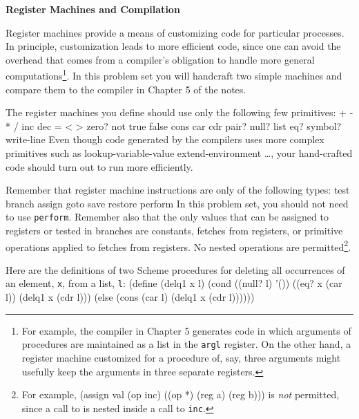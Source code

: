 

\newcommand{\Code}[1]{\mbox{\tt #1}}



\begin{center}
{\bf Register Machines and Compilation}
\end{center}

\medskip

Register machines provide a means of customizing code for particular
processes.  In principle, customization leads to more efficient code,
since one can avoid the overhead that comes from a compiler's obligation
to handle more general computations\footnote{For example, the compiler in Chapter
5 generates code in which arguments of procedures are maintained as a list
in the {\tt argl} register.  On the other hand, a register machine
customized for a procedure of, say, three arguments might usefully keep
the arguments in three separate registers.}.
In this problem set you will handcraft two simple machines and compare
them to the compiler in Chapter 5 of the notes.

The register machines you define should use only the following few
primitives:
\beginlisp
+ - * / inc dec = < > zero?  not true false
cons car cdr pair? null? list eq? symbol? write-line
\endlisp
Even though code generated by the compilers uses more complex primitives
such as 
\beginlisp
lookup-variable-value extend-environment \ldots,
\endlisp
your hand-crafted code should turn out to run more efficiently.

Remember that register machine instructions are only of the
following types:
\beginlisp
test branch assign goto save restore perform
\endlisp
In this problem set, you should not need to use {\tt perform}.
Remember also that the only values that can be assigned to registers
or tested in branches are constants, fetches from registers, or
primitive operations applied to fetches from registers.  No nested
operations are permitted\footnote{For example,
(assign val (op inc) ((op *) (reg a) (reg b)))  
is {\em not} permitted, since a call to {\tt *} is nested inside a
call to {\tt inc}.}.

\medskip
Here are the definitions of two Scheme procedures for deleting all
occurrences of an element, {\tt x}, from a list, {\tt l}:
\beginlisp
(define (delq1 x l)
  (cond ((null? l) '())
        ((eq? x (car l)) (delq1 x (cdr l)))
        (else (cons (car l) (delq1 x (cdr l))))))
\endlisp

